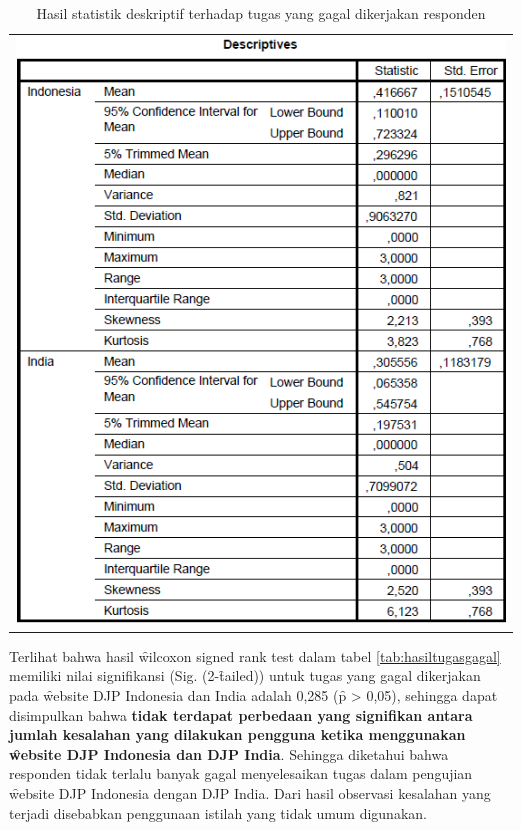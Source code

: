 \begin{table}
\centering
\caption{Hasil statistik deskriptif terhadap tugas yang gagal dikerjakan responden}
\label{tab:tugasgagaldesc}
\begin{tabular}{c}
	\includegraphics[width=\textwidth]
	{pics/tugasgagaldesc.PNG}
\end{tabular}
\end{table}
\noindent
Terlihat bahwa hasil \f{wilcoxon signed rank test} dalam tabel \ref{tab:hasiltugasgagal} memiliki nilai signifikansi (Sig. (2-\f{tailed})) untuk tugas yang gagal dikerjakan pada \f{website} DJP Indonesia dan India adalah 0,285 (\f{p} > 0,05), sehingga dapat disimpulkan bahwa \textbf{tidak terdapat perbedaan yang signifikan antara jumlah kesalahan yang dilakukan pengguna ketika menggunakan \f{website} DJP Indonesia dan DJP India}. Sehingga diketahui bahwa responden tidak terlalu banyak gagal menyelesaikan tugas dalam pengujian \f{website} DJP Indonesia dengan DJP India. Dari hasil observasi kesalahan yang terjadi disebabkan penggunaan istilah yang tidak umum digunakan.
